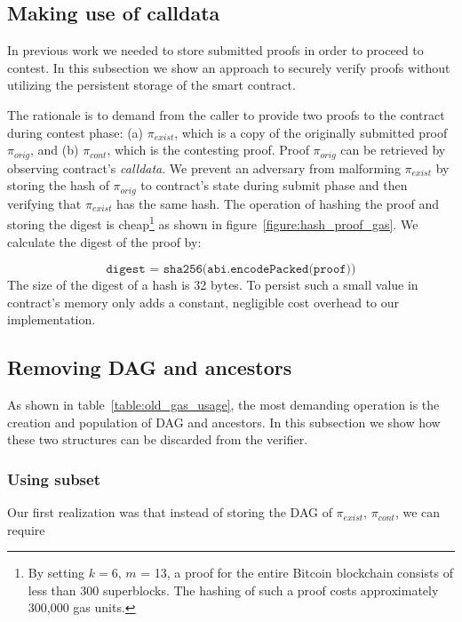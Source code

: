 

\subsection{Making use of calldata}

In previous work we needed to store submitted proofs in order to proceed to
contest. In this subsection we show an approach to securely verify proofs
without utilizing the persistent storage of the smart contract.

The rationale is to demand from the caller to provide two proofs to the
contract during contest phase: (a) $\pi_{exist}$, which is a copy of the
originally submitted proof $\pi_{orig}$, and (b) $\pi_{cont}$, which is the
contesting proof. Proof $\pi_{orig}$ can be retrieved by observing contract's
\textit{calldata}. We prevent an adversary from malforming $\pi_{exist}$ by
storing the hash of $\pi_{orig}$ to contract's state during submit phase and
then verifying that $\pi_{exist}$ has the same hash. The operation of hashing
the proof and storing the digest is cheap\footnote{By setting $k=6$, $m$ = 13,
a proof for the entire Bitcoin blockchain consists of less than 300
superblocks. The hashing of such a proof costs approximately 300,000 gas
units.} as shown in figure~\ref{figure:hash_proof_gas}. We calculate the digest
of the proof by:

\[\texttt{digest = sha256(abi.encodePacked(proof))}\] The size of the digest of
a hash is 32 bytes. To persist such a small value in contract's memory only
adds a constant, negligible cost overhead to our implementation.



\subsection{Removing DAG and ancestors}

As shown in table~\ref{table:old_gas_usage}, the most demanding operation is
the creation and population of DAG and ancestors. In this subsection we show
how these two structures can be discarded from the verifier.

\subsubsection{Using subset} Our first realization was that instead of storing the
DAG of $\pi_{exist}$, $\pi_{cont}$, we can require

